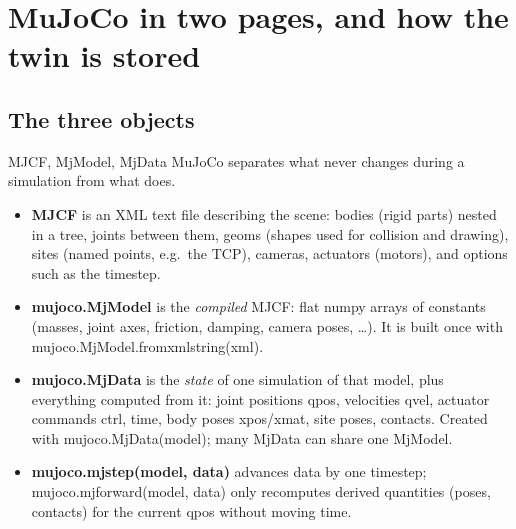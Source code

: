 \documentclass[11pt,a4paper]{article}
\newcommand{\code}[1]{{\small\ttfamily\begingroup\def\_{\textunderscore\allowbreak}\def\/{/\allowbreak}#1\endgroup}}
\begin{document}
\section{MuJoCo in two pages, and how the twin is stored}\label{sec:mujoco}
\subsection{The three objects}
\begin{newc}{MJCF, \code{MjModel}, \code{MjData}}
MuJoCo separates what never changes during a simulation from what does.
\begin{itemize}[leftmargin=*]
\item \textbf{MJCF} is an XML text file describing the scene: bodies (rigid parts) nested in a tree, joints between them, geoms (shapes used for collision and drawing), sites (named points, e.g.\ the TCP), cameras, actuators (motors), and options such as the timestep.
\item \textbf{\code{mujoco.MjModel}} is the \emph{compiled} MJCF: flat numpy arrays of constants (masses, joint axes, friction, damping, camera poses, \ldots). It is built once with \code{mujoco.MjModel.from\_xml\_string(xml)}.
\item \textbf{\code{mujoco.MjData}} is the \emph{state} of one simulation of that model, plus everything computed from it: joint positions \code{qpos}, velocities \code{qvel}, actuator commands \code{ctrl}, time, body poses \code{xpos}/\code{xmat}, site poses, contacts. Created with \code{mujoco.MjData(model)}; many \code{MjData} can share one \code{MjModel}.
\item \textbf{\code{mujoco.mj\_step(model, data)}} advances \code{data} by one timestep; \code{mujoco.mj\_forward(model, data)} only recomputes derived quantities (poses, contacts) for the current \code{qpos} without moving time.
\end{itemize}
\end{newc}
\end{document}
